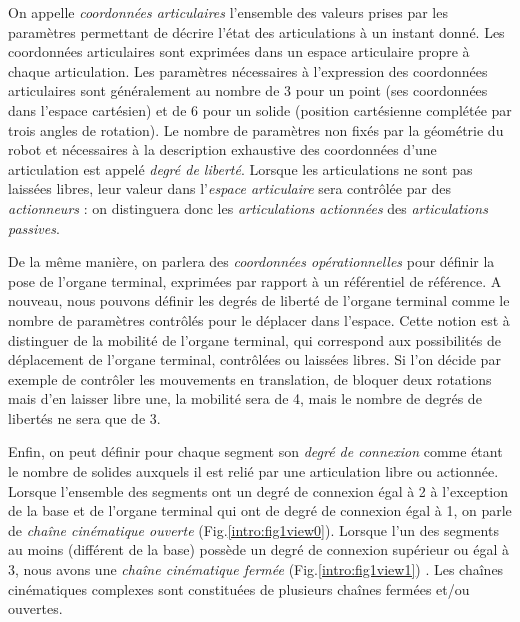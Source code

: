On appelle {\it coordonnées articulaires} l'ensemble des valeurs prises par les 
paramètres permettant de décrire l'état des articulations à un instant donné. 
Les coordonnées articulaires sont exprimées dans un espace articulaire propre à 
chaque articulation. Les paramètres nécessaires à l'expression des coordonnées 
articulaires sont généralement au nombre de 3 pour un point (ses coordonnées 
dans l'espace cartésien) et de 6 pour un solide (position cartésienne complétée 
par trois angles de rotation). Le nombre de paramètres non fixés par la 
géométrie du robot et nécessaires à la description exhaustive des coordonnées 
d'une articulation est appelé {\it degré de liberté}. Lorsque les articulations 
ne sont pas laissées libres, leur valeur dans l'{\it espace articulaire} sera 
contr\^olée par des {\it actionneurs} : on distinguera donc les {\it 
articulations actionnées} des {\it articulations passives}.

De la même manière, on parlera des {\it coordonnées opérationnelles} pour 
définir la pose de l'organe terminal, exprimées par rapport à un référentiel de 
référence. A nouveau, nous pouvons définir les degrés de liberté de l'organe 
terminal comme le nombre de paramètres contr\^olés pour le déplacer dans 
l'espace. Cette notion est à distinguer de la mobilité de l'organe terminal, 
qui 
correspond aux possibilités de déplacement de l'organe terminal, contrôlées ou 
laissées libres. Si l'on décide par exemple de contr\^oler les mouvements en 
translation, de bloquer deux rotations mais d'en laisser libre une, la mobilité 
sera de 4, mais le nombre de degrés de libertés ne sera que de 3.

Enfin, on peut définir pour chaque segment son {\it degré de connexion} comme 
étant le nombre de solides auxquels il est relié par une articulation libre ou 
actionnée. Lorsque l'ensemble des segments ont un degré de connexion égal à 2 à 
l'exception de la base et de l'organe terminal qui ont de degré de connexion 
égal à 1, on parle de {\it cha\^ine cinématique ouverte} 
(Fig.\ref{intro:fig1view0}). Lorsque l'un des segments au moins (différent de 
la 
base) possède un degré de connexion supérieur ou égal à 3, nous avons une {\it 
cha\^ine cinématique fermée} (Fig.\ref{intro:fig1view1}) 
\cite{journals/gosselin1989}. Les cha\^ines cinématiques complexes sont 
constituées de plusieurs cha\^ines fermées et/ou ouvertes.


